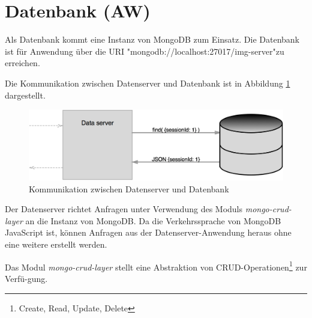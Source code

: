 \section{Datenbank (AW)}
\label{section_datenbank}
Als Datenbank kommt eine Instanz von MongoDB zum Einsatz.
Die Datenbank ist für Anwendung über die URI "mongodb://localhost:27017/img-server"{}zu erreichen.

Die Kommunikation zwischen Datenserver und Datenbank ist in Abbildung 
\ref{fig_kommunikation_datenbank} dargestellt.
\begin{figure}[h]
	\centering
	\includegraphics[width=14cm]{bilder/abbildung_datenbank}
	\caption{Kommunikation zwischen Datenserver und Datenbank}
	\label{fig_kommunikation_datenbank}
\end{figure}

Der Datenserver richtet Anfragen unter Verwendung des Moduls \textit{mongo-crud-layer}
an die Instanz von MongoDB. Da die Verkehrssprache von MongoDB JavaScript ist, können 
Anfragen aus der Datenserver-Anwendung heraus ohne eine weitere erstellt werden.

Das Modul \textit{mongo-crud-layer} stellt eine Abstraktion von CRUD-Operationen\footnote{Create, Read, Update, Delete} zur Verfü-gung.
